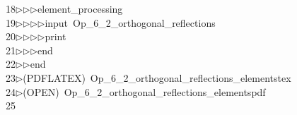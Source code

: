 \begin{tabbing}
18\>$\triangleright$\>$\triangleright$\>$\triangleright$\>element\_processing\ \\[0pt]
19\>$\triangleright$\>$\triangleright$\>$\triangleright$\>$\triangleright$\>input\ Op\_6\_2\_orthogonal\_reflections\ \\[0pt]
20\>$\triangleright$\>$\triangleright$\>$\triangleright$\>$\triangleright$\>print\ \\[0pt]
21\>$\triangleright$\>$\triangleright$\>$\triangleright$\>end\ \\[0pt]
22\>$\triangleright$\>$\triangleright$\>end\\[0pt]
23\>$\triangleright$\>(PDFLATEX)\ Op\_6\_2\_orthogonal\_reflections\_elementstex\\[0pt]
24\>$\triangleright$\>(OPEN)\ Op\_6\_2\_orthogonal\_reflections\_elementspdf\\[0pt]
25\>\end{tabbing}

